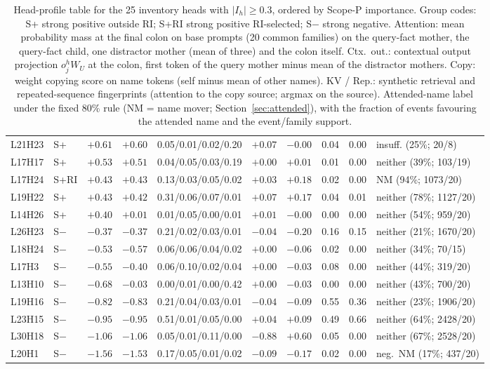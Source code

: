 \documentclass[11pt,a4paper]{article}
\begin{document}
\begin{table}[p]
{\begin{tabular}{llrrlrrrrl}
L21H23 & S+ & $+0.61$ & $+0.60$ & 0.05/0.01/0.02/0.20 & $+0.07$ & $-0.00$ & 0.04 & 0.00 & insuff. (25\%; 20/8) \\
L17H17 & S+ & $+0.53$ & $+0.51$ & 0.04/0.05/0.03/0.19 & $+0.00$ & $+0.01$ & 0.01 & 0.00 & neither (39\%; 103/19) \\
L17H24 & S+RI & $+0.43$ & $+0.43$ & 0.13/0.03/0.05/0.02 & $+0.03$ & $+0.18$ & 0.02 & 0.00 & NM (94\%; 1073/20) \\
L19H22 & S+ & $+0.43$ & $+0.42$ & 0.31/0.06/0.07/0.01 & $+0.07$ & $+0.17$ & 0.04 & 0.01 & neither (78\%; 1127/20) \\
L14H26 & S+ & $+0.40$ & $+0.01$ & 0.01/0.05/0.00/0.01 & $+0.01$ & $-0.00$ & 0.00 & 0.00 & neither (54\%; 959/20) \\
L26H23 & S$-$ & $-0.37$ & $-0.37$ & 0.21/0.02/0.03/0.01 & $-0.04$ & $-0.20$ & 0.16 & 0.15 & neither (21\%; 1670/20) \\
L18H24 & S$-$ & $-0.53$ & $-0.57$ & 0.06/0.06/0.04/0.02 & $+0.00$ & $-0.06$ & 0.02 & 0.00 & neither (34\%; 70/15) \\
L17H3 & S$-$ & $-0.55$ & $-0.40$ & 0.06/0.10/0.02/0.04 & $+0.00$ & $-0.03$ & 0.08 & 0.00 & neither (44\%; 319/20) \\
L13H10 & S$-$ & $-0.68$ & $-0.03$ & 0.00/0.01/0.00/0.42 & $+0.00$ & $-0.03$ & 0.00 & 0.00 & neither (43\%; 700/20) \\
L19H16 & S$-$ & $-0.82$ & $-0.83$ & 0.21/0.04/0.03/0.01 & $-0.04$ & $-0.09$ & 0.55 & 0.36 & neither (23\%; 1906/20) \\
L23H15 & S$-$ & $-0.95$ & $-0.95$ & 0.51/0.01/0.05/0.00 & $+0.04$ & $+0.09$ & 0.49 & 0.66 & neither (64\%; 2428/20) \\
L30H18 & S$-$ & $-1.06$ & $-1.06$ & 0.05/0.01/0.11/0.00 & $-0.88$ & $+0.60$ & 0.05 & 0.00 & neither (67\%; 2528/20) \\
L20H1 & S$-$ & $-1.56$ & $-1.53$ & 0.17/0.05/0.01/0.02 & $-0.09$ & $-0.17$ & 0.02 & 0.00 & neg.\ NM (17\%; 437/20) \\
\bottomrule
\end{tabular}%
}
\caption{Head-profile table for the 25 inventory heads with $|I_h|\ge 0.3$, ordered by Scope-P importance. Group codes: S+ strong positive outside RI; S+RI strong positive RI-selected; S$-$ strong negative. Attention: mean probability mass at the final colon on base prompts (20 common families) on the query-fact mother, the query-fact child, one distractor mother (mean of three) and the colon itself. Ctx.\ out.: contextual output projection $o^h_j W_U$ at the colon, first token of the query mother minus mean of the distractor mothers. Copy: weight copying score on name tokens (self minus mean of other names). KV / Rep.: synthetic retrieval and repeated-sequence fingerprints (attention to the copy source; argmax on the source). Attended-name label under the fixed 80\% rule (NM = name mover; Section~\ref{sec:attended}), with the fraction of events favouring the attended name and the event/family support.}
\label{tab:profiles}
\end{table}
\end{document}

